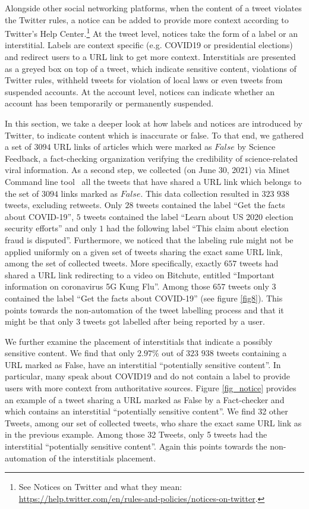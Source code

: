 \documentclass{article}
\begin{document}
Alongside other social networking platforms, when the content of a tweet violates the Twitter rules, a notice can be added to provide more context according to Twitter's Help Center.\footnote{See Notices on Twitter and what they mean: \href{https://help.twitter.com/en/rules-and-policies/notices-on-twitter}{https://help.twitter.com/en/rules-and-policies/notices-on-twitter}.} At the tweet level, notices take the form of a label or an interstitial. Labels are context specific (e.g. COVID19 or presidential elections) and  redirect users to a URL link to get more context. Interstitials are presented as a greyed box on top of a tweet, which indicate sensitive content, violations of Twitter rules, withheld tweets for violation of local laws or even tweets from suspended accounts. At the account level, notices can indicate whether an account has been temporarily or permanently suspended. 

\smallskip

In this section, we take a deeper look at how labels and notices are introduced by Twitter, to indicate content which is inaccurate or false. To that end, we gathered a set of $3094$ URL links of articles which were marked as $False$ by Science Feedback, a fact-checking organization verifying the credibility of science-related viral information. As a second step, we collected (on June 30, 2021) via Minet Command line tool~\cite{minet} all the tweets that have shared a URL link which belongs to the set of $3094$ links marked as $False$. This data collection resulted in $323$ $938$ tweets, excluding retweets. Only $28$ tweets contained the label { ``Get the facts about COVID-19''}, $5$ tweets contained the label { ``Learn about US 2020 election security efforts''} and only $1$ had the following label {``This claim about election fraud is disputed''}. Furthermore, we noticed that the labeling rule might not be applied uniformly on a given set of tweets sharing the exact same URL link, among the set of collected tweets. More specifically, exactly $657$ tweets had shared a URL link redirecting to a video on Bitchute, entitled ``Important information on coronavirus 5G Kung Flu''. Among those $657$ tweets only $3$ contained the label ``Get the facts about COVID-19'' (see figure \ref{fig8}). This points towards the non-automation of the tweet labelling process and that it might be that only $3$ tweets got labelled after being reported by a user. 

We further examine the placement of interstitials that indicate a possibly sensitive content. We find that only $2.97\%$ out of $323$ $938$ tweets containing a URL marked as False, have an interstitial ``potentially sensitive content''. In particular, many speak about COVID19 and do not contain a label to provide users with more context from authoritative sources. Figure \ref{fig_notice} provides an example of a tweet sharing a URL marked as False by a Fact-checker and which contains an interstitial ``potentially sensitive content''. We find 32 other Tweets, among our set of collected tweets, who share the exact same URL link as in the previous example. Among those 32 Tweets, only 5 tweets had the interstitial ``potentially sensitive content''. Again this points towards the non-automation of the interstitials placement. 
\end{document}
